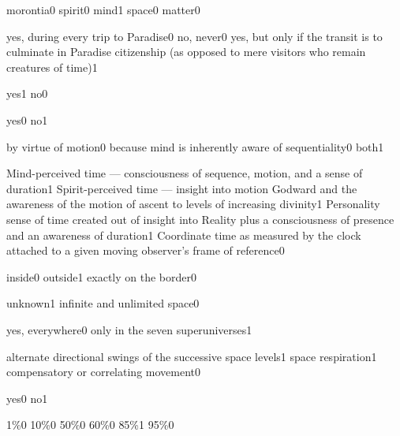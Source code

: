{morontia}{0}
{spirit}{0}
{mind}{1}
{space}{0}
{matter}{0}
\qstop

{yes, during every trip to Paradise}{0}
{no, never}{0}
{yes, but only if the transit is to culminate in Paradise citizenship (as opposed to mere visitors who remain creatures of time)}{1}
\qstop

{yes}{1}
{no}{0}
\qstop

{yes}{0}
{no}{1}
\qstop

{by virtue of motion}{0}
{because mind is inherently aware of sequentiality}{0}
{both}{1}
\qstop

{Mind-perceived time --- consciousness of sequence, motion, and a sense of duration}{1}
{Spirit-perceived time --- insight into motion Godward and the awareness of the motion of ascent to levels of increasing divinity}{1}
{Personality sense of time created out of insight into Reality plus a consciousness of presence and an awareness of duration}{1}
{Coordinate time as measured by the clock attached to a given moving observer's frame of reference}{0}
\qstop

{inside}{0}
{outside}{1}
{exactly on the border}{0}
\qstop

{unknown}{1}
{infinite and unlimited space}{0}
\qstop

{yes, everywhere}{0}
{only in the seven superuniverses}{1}
\qstop

{alternate directional swings of the successive space levels}{1}
{space respiration}{1}
{compensatory or correlating movement}{0}
\qstop

{yes}{0}
{no}{1}
\qstop

{1\%}{0}
{10\%}{0}
{50\%}{0}
{60\%}{0}
{85\%}{1}
{95\%}{0}
\qstop

